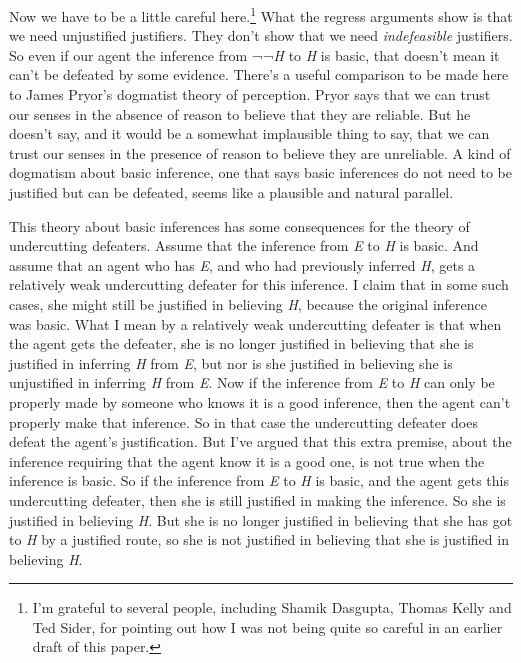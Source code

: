 \documentclass[
  10pt,
  letterpaper,
  DIV=11,
  numbers=noendperiod,
  twoside]{scrartcl}
\begin{document}
Now we have to be a little careful here.\footnote{I'm grateful to
  several people, including Shamik Dasgupta, Thomas Kelly and Ted Sider,
  for pointing out how I was not being quite so careful in an earlier
  draft of this paper.} What the regress arguments show is that we need
unjustified justifiers. They don't show that we need \emph{indefeasible}
justifiers. So even if our agent the inference from ¬¬\emph{H} to
\emph{H} is basic, that doesn't mean it can't be defeated by some
evidence. There's a useful comparison to be made here to James Pryor's
dogmatist theory of perception. Pryor says that we can trust our senses
in the absence of reason to believe that they are reliable. But he
doesn't say, and it would be a somewhat implausible thing to say, that
we can trust our senses in the presence of reason to believe they are
unreliable. A kind of dogmatism about basic inference, one that says
basic inferences do not need to be justified but can be defeated, seems
like a plausible and natural parallel.

This theory about basic inferences has some consequences for the theory
of undercutting defeaters. Assume that the inference from \emph{E} to
\emph{H} is basic. And assume that an agent who has \emph{E}, and who
had previously inferred \emph{H}, gets a relatively weak undercutting
defeater for this inference. I claim that in some such cases, she might
still be justified in believing \emph{H}, because the original inference
was basic. What I mean by a relatively weak undercutting defeater is
that when the agent gets the defeater, she is no longer justified in
believing that she is justified in inferring \emph{H} from \emph{E}, but
nor is she justified in believing she is unjustified in inferring
\emph{H} from \emph{E}. Now if the inference from \emph{E} to \emph{H}
can only be properly made by someone who knows it is a good inference,
then the agent can't properly make that inference. So in that case the
undercutting defeater does defeat the agent's justification. But I've
argued that this extra premise, about the inference requiring that the
agent know it is a good one, is not true when the inference is basic. So
if the inference from \emph{E} to \emph{H} is basic, and the agent gets
this undercutting defeater, then she is still justified in making the
inference. So she is justified in believing \emph{H}. But she is no
longer justified in believing that she has got to \emph{H} by a
justified route, so she is not justified in believing that she is
justified in believing \emph{H}.
\end{document}
